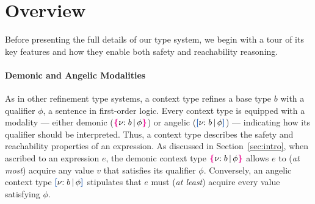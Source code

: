 \section{Overview}
\label{sec:overview}
Before presenting the full details of our type system, we begin with a
tour of its key features and how they enable both safety and
reachability reasoning.


\paragraph{Demonic and Angelic Modalities}



As in other refinement type systems, a context type refines a base
type $b$ with a qualifier $\phi$, a sentence in first-order
logic. Every context type is equipped with a modality — either demonic
($\textcolor{magenta}{\mbox{\rm\textbf{\{}}} { {\nu}{:}\;{b}\, |\, {\phi} } \textcolor{magenta}{\mbox{\rm\textbf{\}}}}$) or angelic ($\urt{b}{\phi}$) — indicating how its
qualifier should be interpreted.  Thus, a context type describes the
safety and reachability properties of an expression. As discussed in
Section~\ref{sec:intro}, when ascribed to an expression $e$, the demonic
context type $\textcolor{magenta}{\mbox{\rm\textbf{\{}}} { {\nu}{:}\;{b}\, |\, {\phi} } \textcolor{magenta}{\mbox{\rm\textbf{\}}}}$ allows $e$ to (\emph{at most}) acquire
any value $v$ that satisfies its qualifier $\phi$.  Conversely, an
angelic context type $\urt{b}{\phi}$ stipulates that $e$ must
(\emph{at least}) acquire every value satisfying $\phi$.

